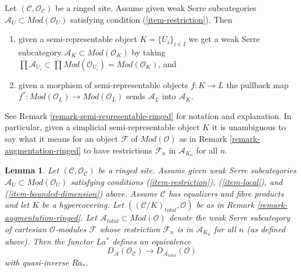 \documentclass{stacks-project}
\theoremstyle{plain}
\newtheorem{lemma}[subsection]{Lemma}
\theoremstyle{definition}
\theoremstyle{remark}
\numberwithin{equation}{subsection}
\begin{document}
\noindent
Let $(\mathcal{C}, \mathcal{O}_\mathcal{C})$ be a ringed site.
Assume given weak Serre subcategories
$\mathcal{A}_U \subset \textit{Mod}(\mathcal{O}_U)$
satisfying condition (\ref{item-restriction}).
Then
\begin{enumerate}
\item given a semi-representable object $K = \{U_i\}_{i \in I}$
we get a weak Serre subcategory
$\mathcal{A}_K \subset \textit{Mod}(\mathcal{O}_K)$
by taking $\prod \mathcal{A}_{U_i} \subset 
\prod \textit{Mod}(\mathcal{O}_{U_i}) = \textit{Mod}(\mathcal{O}_K)$, and
\item given a morphism of semi-representable objects
$f : K \to L$ the pullback map
$f^* : \textit{Mod}(\mathcal{O}_L) \to \textit{Mod}(\mathcal{O}_L)$
sends $\mathcal{A}_L$ into $\mathcal{A}_K$.
\end{enumerate}
See Remark \ref{remark-semi-representable-ringed} for notation and
explanation. In particular, given a simplicial semi-representable object $K$
it is unambiguous to say what it means for an object $\mathcal{F}$ of
$\textit{Mod}(\mathcal{O})$ as in Remark \ref{remark-augmentation-ringed}
to have restrictions $\mathcal{F}_n$ in
$\mathcal{A}_{K_n}$ for all $n$.

\begin{lemma}
\label{lemma-hypercovering-equivalence-modules}
Let $(\mathcal{C}, \mathcal{O}_\mathcal{C})$ be a ringed site.
Assume given weak Serre subcategories
$\mathcal{A}_U \subset \textit{Mod}(\mathcal{O}_U)$
satisfying conditions (\ref{item-restriction}),
(\ref{item-local}), and (\ref{item-bounded-dimension}) above.
Assume $\mathcal{C}$ has equalizers and fibre products and
let $K$ be a hypercovering.
Let $((\mathcal{C}/K)_{total}, \mathcal{O})$ be as in
Remark \ref{remark-augmentation-ringed}.
Let $\mathcal{A}_{total} \subset \textit{Mod}(\mathcal{O})$
denote the weak Serre subcategory of cartesian $\mathcal{O}$-modules
$\mathcal{F}$ whose restriction $\mathcal{F}_n$ is in
$\mathcal{A}_{K_n}$ for all $n$ (as defined above).
Then the functor $La^*$ defines an equivalence
$$
D_\mathcal{A}(\mathcal{O}_\mathcal{C})
\longrightarrow
D_{\mathcal{A}_{total}}(\mathcal{O})
$$
with quasi-inverse $Ra_*$.
\end{lemma}
\end{document}
